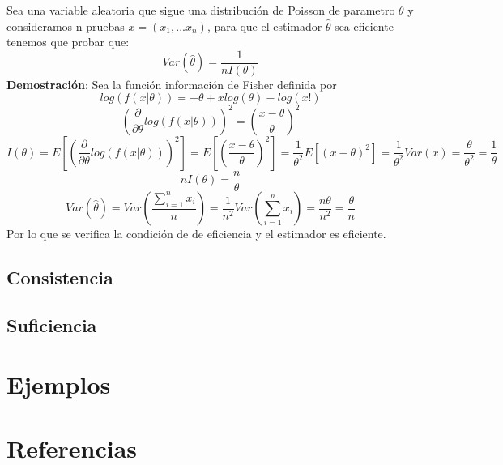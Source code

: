 \documentclass[a4paper, 10pt]{article} %
\newcounter{def}
\begin{document}
Sea una variable aleatoria que sigue una distribución de Poisson de parametro $\theta$ y consideramos n pruebas $x=(x_1,...x_n)$, para que el estimador $\hat{\theta}$ sea eficiente tenemos que probar que:
$$Var(\hat{\theta})=\frac{1}{nI(\theta)}$$
\textbf{Demostración}:
Sea la función información de Fisher definida por 
$$log(f(x|\theta))=-\theta + xlog(\theta) -log(x!)$$
$$(\frac{\partial}{\partial\theta}log(f(x|\theta)))^2=(\frac{x-\theta}{\theta})^2$$
$$I(\theta)=E[(\frac{\partial}{\partial\theta}log(f(x|\theta)))^2]=E[(\frac{x-\theta}{\theta})^2]=\frac{1}{\theta^2}E[(x-\theta)^2]=\frac{1}{\theta^2}Var(x)=\frac{\theta}{\theta^2}=\frac{1}{\theta}$$
$$nI(\theta)=\frac{n}{\theta}$$
$$Var(\hat{\theta})=Var(\frac{\sum_{i=1}^{n}x_i}{n})=\frac{1}{n^2}Var(\sum_{i=1}^{n}x_i)=\frac{n\theta}{n^2}=\frac{\theta}{n}$$
Por lo que se verifica la condición de de eficiencia y el estimador es eficiente.
\subsection{Consistencia}
\subsection{Suficiencia}
\section{Ejemplos}
\section{Referencias}
\end{document}
